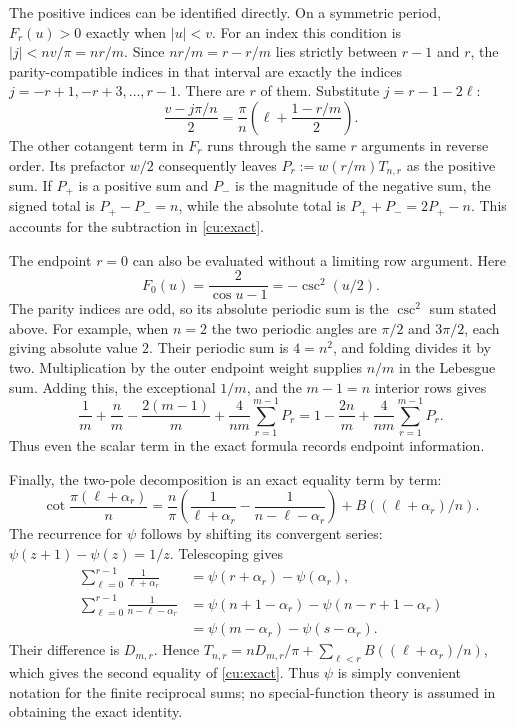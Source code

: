 The positive indices can be identified directly.
On a symmetric period, $F_r(u)>0$ exactly when $|u|<v$.
For an index this condition is $|j|<nv/\pi=nr/m$.
Since $nr/m=r-r/m$ lies strictly between $r-1$ and $r$,
the parity-compatible indices in that interval are exactly the
indices $j=-r+1,-r+3,\ldots,r-1$. There are $r$ of them. Substitute $j=r-1-2\ell$:
\[
 \frac{v-j\pi/n}{2}
 =\frac\pi n\left(\ell+\frac{1-r/m}{2}\right).
\]
The other cotangent term in $F_r$ runs through the same $r$
arguments in reverse order. Its prefactor $w/2$ consequently leaves
$P_r:=w(r/m)T_{n,r}$ as the positive sum. If $P_+$ is a positive sum and $P_-$
is the magnitude of the negative sum, the signed total is $P_+-P_-=n$,
while the absolute total is $P_++P_-=2P_+-n$. This accounts for the
subtraction in \eqref{cu:exact}.

The endpoint $r=0$ can also be evaluated without a limiting row
argument. Here
\[
 F_0(u)=\frac2{\cos u-1}=-\csc^2(u/2).
\]
The parity indices are odd, so its absolute periodic sum is the
$\csc^2$ sum stated above. For example, when $n=2$ the two periodic
angles are $\pi/2$ and $3\pi/2$, each giving absolute value $2$.
Their periodic sum is $4=n^2$, and folding divides it by two.
Multiplication by the outer endpoint weight supplies $n/m$ in the
Lebesgue sum. Adding this, the exceptional $1/m$, and the $m-1=n$
interior rows gives
\[
 \frac1m+\frac nm-\frac{2(m-1)}m
       +\frac4{nm}\sum_{r=1}^{m-1}P_r
   =1-\frac{2n}{m}+\frac4{nm}\sum_{r=1}^{m-1}P_r.
\]
Thus even the scalar term in the exact formula records endpoint
information.

Finally, the two-pole decomposition is an exact equality term by
term:
\[
 \cot\frac{\pi(\ell+\alpha_r)}n
 =\frac n\pi\left(\frac1{\ell+\alpha_r}
                   -\frac1{n-\ell-\alpha_r}\right)
      +B((\ell+\alpha_r)/n).
\]
The recurrence for $\psi$ follows by shifting its convergent series:
$\psi(z+1)-\psi(z)=1/z$. Telescoping gives
\[
 \begin{aligned}
 \sum_{\ell=0}^{r-1}\frac1{\ell+\alpha_r}
       &=\psi(r+\alpha_r)-\psi(\alpha_r),\\
 \sum_{\ell=0}^{r-1}\frac1{n-\ell-\alpha_r}
       &=\psi(n+1-\alpha_r)-\psi(n-r+1-\alpha_r)\\
       &=\psi(m-\alpha_r)-\psi(s-\alpha_r).
 \end{aligned}
\]
Their difference is $D_{m,r}$. Hence
$T_{n,r}=nD_{m,r}/\pi+\sum_{\ell<r}B((\ell+\alpha_r)/n)$,
which gives the second equality of \eqref{cu:exact}. Thus $\psi$ is simply convenient
notation for the finite reciprocal sums; no special-function theory
is assumed in obtaining the exact identity.

